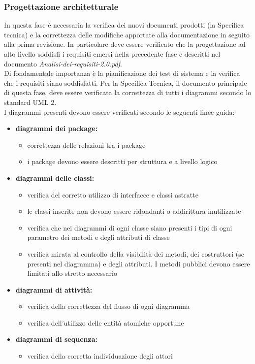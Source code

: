 \documentclass[a4paper,11pt]{article}
\begin{document}
\subsubsection{Progettazione architetturale}
In questa fase è necessaria la verifica dei nuovi documenti prodotti (la Specifica tecnica) e la correttezza delle modifiche apportate alla documentazione in seguito alla prima revisione. In particolare deve essere verificato che la progettazione ad alto livello soddisfi i requisiti emersi nella precedente fase e descritti nel documento \textit{Analisi-dei-requisiti-2.0.pdf}. \\
Di fondamentale importanza è la pianificazione dei test di sistema e la verifica che i requisiti siano soddisfatti.
Per la Specifica Tecnica, il documento principale di questa fase, deve essere verificata la correttezza di tutti i diagrammi secondo lo standard UML 2. \\
I diagrammi presenti devono essere verificati secondo le seguenti linee guida: 
\begin{itemize}
\item \textbf{diagrammi dei package:} 
\begin{itemize}
\item correttezza delle relazioni tra i package
\item i package devono essere descritti per struttura e a livello logico
\end{itemize}
\item \textbf{diagrammi delle classi:}
\begin{itemize}
\item verifica del corretto utilizzo di interfacce e classi astratte
\item le classi inserite non devono essere ridondanti o addirittura inutilizzate
\item verifica che nei diagrammi di ogni classe siano presenti i tipi di ogni parametro dei metodi e degli attributi di classe
\item verifica mirata al controllo della visibilità dei metodi, dei costruttori (se presenti nel diagramma) e degli attributi. I metodi pubblici devono essere limitati allo stretto necessario
\end{itemize}
\item \textbf{diagrammi di attività:}
\begin{itemize}
\item verifica della correttezza del flusso di ogni diagramma
\item verifica dell'utilizzo delle entità atomiche opportune
\end{itemize}
\item \textbf{diagrammi di sequenza:}
\begin{itemize}
\item verifica della corretta individuazione degli attori
\end{itemize}
\end{itemize}
\end{document}
